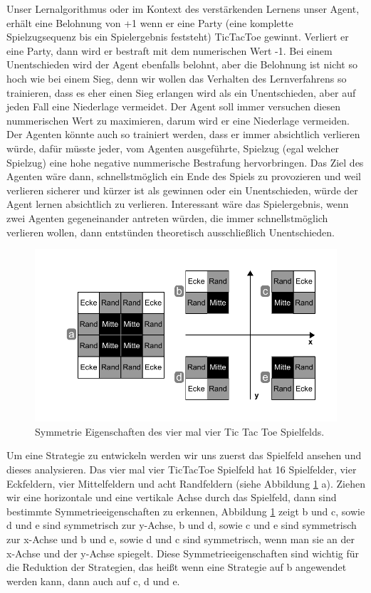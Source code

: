 Unser Lernalgorithmus oder im Kontext des verstärkenden Lernens unser Agent, erhält eine Belohnung von +1 wenn er eine Party (eine komplette Spielzugsequenz bis ein Spielergebnis feststeht) TicTacToe gewinnt. Verliert er eine Party, dann wird er bestraft mit dem numerischen Wert -1. Bei einem Unentschieden wird der Agent ebenfalls belohnt, aber die Belohnung ist nicht so hoch wie bei einem Sieg, denn wir wollen das Verhalten des Lernverfahrens so trainieren, dass es eher einen Sieg erlangen wird als ein Unentschieden, aber auf jeden Fall eine Niederlage vermeidet. Der Agent soll immer versuchen diesen nummerischen Wert zu maximieren, darum wird er eine Niederlage vermeiden. Der Agenten könnte auch so trainiert werden, dass er immer absichtlich verlieren würde, dafür müsste jeder, vom Agenten ausgeführte, Spielzug (egal welcher Spielzug) eine hohe negative nummerische Bestrafung hervorbringen. Das Ziel des Agenten wäre dann, schnellstmöglich ein Ende des Spiels zu provozieren und weil verlieren sicherer und kürzer ist als gewinnen oder ein Unentschieden, würde der Agent lernen absichtlich zu verlieren. Interessant wäre das Spielergebnis, wenn zwei Agenten gegeneinander antreten würden, die immer schnellstmöglich verlieren wollen, dann entstünden theoretisch ausschließlich Unentschieden.



\begin{figure}[!htbp]
  \centering
  \includegraphics[scale = 1]{inhalt/abbildungen/symmetrie_tictactoe_spielfeld.pdf}
  \caption{Symmetrie Eigenschaften des vier mal vier Tic Tac Toe Spielfelds.}
  \label{fig:symmetrie_tictactoe_spielfeld}
\end{figure}

Um eine Strategie zu entwickeln werden wir uns zuerst das Spielfeld ansehen und dieses analysieren. Das vier mal vier TicTacToe Spielfeld hat 16 Spielfelder, vier Eckfeldern, vier Mittelfeldern und acht Randfeldern (siehe Abbildung \ref{fig:symmetrie_tictactoe_spielfeld} a). Ziehen wir eine horizontale und eine vertikale Achse durch das Spielfeld, dann sind bestimmte Symmetrieeigenschaften zu erkennen, Abbildung \ref{fig:symmetrie_tictactoe_spielfeld} zeigt b und c, sowie d und e sind symmetrisch zur y-Achse, b und d, sowie c und e sind symmetrisch zur x-Achse und b und e, sowie d und c sind symmetrisch, wenn man sie an der x-Achse und der y-Achse spiegelt. Diese Symmetrieeigenschaften sind wichtig für die Reduktion der Strategien, das heißt wenn eine Strategie auf b angewendet werden kann, dann auch auf c, d und e.

